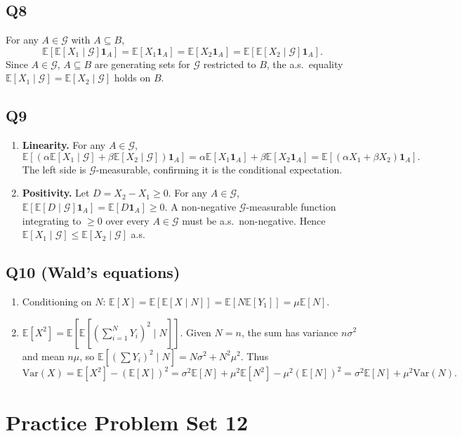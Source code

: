 \documentclass[11pt]{article}
\newcommand{\EE}{\mathbb{E}}
\newcommand{\1}{\mathbf{1}}
\begin{document}
\subsection*{Q8}
For any $A\in\mathcal G$ with $A\subseteq B$,
\[
\EE[\EE[X_1\mid\mathcal G]\1_A]=\EE[X_1\1_A]=\EE[X_2\1_A]=\EE[\EE[X_2\mid\mathcal G]\1_A].
\]
Since $A\in\mathcal G$, $A\subseteq B$ are generating sets for $\mathcal G$ restricted to $B$, the a.s.\ equality $\EE[X_1\mid\mathcal G]=\EE[X_2\mid\mathcal G]$ holds on $B$.

\subsection*{Q9}
\begin{enumerate}[label=(\alph*)]
\item \textbf{Linearity.} For any $A\in\mathcal G$,
\[
\EE[(\alpha\EE[X_1\mid\mathcal G]+\beta\EE[X_2\mid\mathcal G])\1_A]
=\alpha\EE[X_1\1_A]+\beta\EE[X_2\1_A]=\EE[(\alpha X_1+\beta X_2)\1_A].
\]
The left side is $\mathcal G$-measurable, confirming it is the conditional expectation.
\item \textbf{Positivity.} Let $D=X_2-X_1\ge0$.  For any $A\in\mathcal G$,
$\EE[\EE[D\mid\mathcal G]\1_A]=\EE[D\1_A]\ge0$.
A non-negative $\mathcal G$-measurable function integrating to $\ge0$ over every $A\in\mathcal G$ must be a.s.\ non-negative.  Hence $\EE[X_1\mid\mathcal G]\le\EE[X_2\mid\mathcal G]$ a.s.
\end{enumerate}

\subsection*{Q10 (Wald's equations)}
\begin{enumerate}[label=(\alph*)]
\item Conditioning on $N$: $\EE[X]=\EE[\EE[X\mid N]]=\EE[N\EE[Y_1]]=\mu\EE[N]$.
\item $\EE[X^2]=\EE[\EE[({\textstyle\sum_{i=1}^N Y_i})^2\mid N]]$.  Given $N=n$, the sum has variance $n\sigma^2$ and mean $n\mu$, so $\EE[(\sum Y_i)^2\mid N]=N\sigma^2+N^2\mu^2$.  Thus
\[
\mathrm{Var}(X)=\EE[X^2]-(\EE[X])^2=\sigma^2\EE[N]+\mu^2\EE[N^2]-\mu^2(\EE[N])^2=\sigma^2\EE[N]+\mu^2\mathrm{Var}(N).
\]
\end{enumerate}

\section{Practice Problem Set 12}
\end{document}
